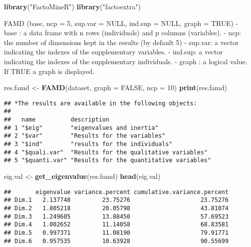 \documentclass[
]{article}
\newenvironment{Shaded}{\begin{snugshade}}{\end{snugshade}}
\newcommand{\DataTypeTok}[1]{\textcolor[rgb]{0.13,0.29,0.53}{#1}}
\newcommand{\DecValTok}[1]{\textcolor[rgb]{0.00,0.00,0.81}{#1}}
\newcommand{\KeywordTok}[1]{\textcolor[rgb]{0.13,0.29,0.53}{\textbf{#1}}}
\newcommand{\NormalTok}[1]{#1}
\newcommand{\OtherTok}[1]{\textcolor[rgb]{0.56,0.35,0.01}{#1}}
\newcommand{\StringTok}[1]{\textcolor[rgb]{0.31,0.60,0.02}{#1}}
\begin{document}
\begin{Shaded}
\begin{Highlighting}[]
\KeywordTok{library}\NormalTok{(}\StringTok{"FactoMineR"}\NormalTok{)}
\KeywordTok{library}\NormalTok{(}\StringTok{"factoextra"}\NormalTok{)}
\end{Highlighting}
\end{Shaded}

FAMD (base, ncp = 5, sup.var = NULL, ind.sup = NULL, graph = TRUE) -
base : a data frame with n rows (individuals) and p columns (variables).
- ncp: the number of dimensions kept in the results (by default 5) -
sup.var: a vector indicating the indexes of the supplementary variables.
- ind.sup: a vector indicating the indexes of the supplementary
individuals. - graph : a logical value. If TRUE a graph is displayed.

\begin{Shaded}
\begin{Highlighting}[]
\NormalTok{res.famd <-}\StringTok{ }\KeywordTok{FAMD}\NormalTok{(dataset, }\DataTypeTok{graph =} \OtherTok{FALSE}\NormalTok{, }\DataTypeTok{ncp =} \DecValTok{10}\NormalTok{)}
\KeywordTok{print}\NormalTok{(res.famd)}
\end{Highlighting}
\end{Shaded}

\begin{verbatim}
## *The results are available in the following objects:
## 
##   name          description                             
## 1 "$eig"        "eigenvalues and inertia"               
## 2 "$var"        "Results for the variables"             
## 3 "$ind"        "results for the individuals"           
## 4 "$quali.var"  "Results for the qualitative variables" 
## 5 "$quanti.var" "Results for the quantitative variables"
\end{verbatim}

\begin{Shaded}
\begin{Highlighting}[]
\NormalTok{eig.val <-}\StringTok{ }\KeywordTok{get_eigenvalue}\NormalTok{(res.famd)}
\KeywordTok{head}\NormalTok{(eig.val)}
\end{Highlighting}
\end{Shaded}

\begin{verbatim}
##       eigenvalue variance.percent cumulative.variance.percent
## Dim.1   2.137748         23.75276                    23.75276
## Dim.2   1.805218         20.05798                    43.81074
## Dim.3   1.249605         13.88450                    57.69523
## Dim.4   1.002652         11.14058                    68.83581
## Dim.5   0.997371         11.08190                    79.91771
## Dim.6   0.957535         10.63928                    90.55699
\end{verbatim}
\end{document}
